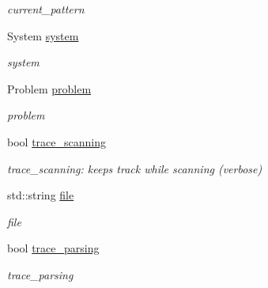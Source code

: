 \begin{DoxyCompactItemize}
\begin{DoxyCompactList}\small\item\em current\+\_\+pattern \end{DoxyCompactList}\item 
System \hyperlink{classspec__driver_ae012fcf3dbf5b42df635cc3e5ca49cb1}{system}\hypertarget{classspec__driver_ae012fcf3dbf5b42df635cc3e5ca49cb1}{}\label{classspec__driver_ae012fcf3dbf5b42df635cc3e5ca49cb1}

\begin{DoxyCompactList}\small\item\em system \end{DoxyCompactList}\item 
Problem \hyperlink{classspec__driver_a90eb87057b6e71f1fb6b383a17d9b599}{problem}\hypertarget{classspec__driver_a90eb87057b6e71f1fb6b383a17d9b599}{}\label{classspec__driver_a90eb87057b6e71f1fb6b383a17d9b599}

\begin{DoxyCompactList}\small\item\em problem \end{DoxyCompactList}\item 
bool \hyperlink{classspec__driver_a42dbd5f4b0e37e3960acf66e0d7e35cc}{trace\+\_\+scanning}\hypertarget{classspec__driver_a42dbd5f4b0e37e3960acf66e0d7e35cc}{}\label{classspec__driver_a42dbd5f4b0e37e3960acf66e0d7e35cc}

\begin{DoxyCompactList}\small\item\em trace\+\_\+scanning\+: keeps track while scanning (verbose) \end{DoxyCompactList}\item 
std\+::string \hyperlink{classspec__driver_ae464044f944cddc8ee4bb5190ff2213d}{file}\hypertarget{classspec__driver_ae464044f944cddc8ee4bb5190ff2213d}{}\label{classspec__driver_ae464044f944cddc8ee4bb5190ff2213d}

\begin{DoxyCompactList}\small\item\em file \end{DoxyCompactList}\item 
bool \hyperlink{classspec__driver_a8aecceacb14f142966e5a792112f26b7}{trace\+\_\+parsing}\hypertarget{classspec__driver_a8aecceacb14f142966e5a792112f26b7}{}\label{classspec__driver_a8aecceacb14f142966e5a792112f26b7}

\begin{DoxyCompactList}\small\item\em trace\+\_\+parsing \end{DoxyCompactList}\end{DoxyCompactItemize}
